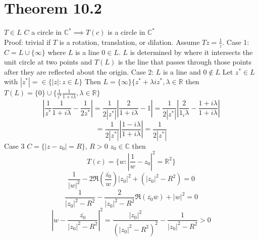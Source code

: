 \documentclass[11pt]{article}
\begin{document}
\section{Theorem 10.2}
$T \in L$  $C$ a circle in $ \mathbb{C}^{*} \implies T(c)$ is a circle  in $ \mathbb{C}^{*}$ \\
Proof:
trivial if $T$ is a rotation, translation, or dilation.
Assume  $Tz = \frac{1}{z}$.
Case 1: $C = L \cup \{\infty\}$ where $L$ is a line $0 \in L$.  $L$ is determined by where it intersects the unit circle at two points
and  $T(L)$ is the line that passes through those points after they are reflected about the origin.
Case 2:  $L$ is a line and  $0 \not\in L$ Let $z^{*} \in L$ with $|z^{*}| = \in\{|z| : z \in L\}$ 
Then $L = \{\infty\} \{z^{*} + \lambda i z^{*}, \lambda \in \mathbb{R}$ then $T(L) = \{0\} \cup \{\frac{1}{z^{*}}\frac{1}{1+ i \lambda}, \lambda \in \mathbb{R}\}$
\[
|\frac{1}{z^{*}} \frac{1}{1+i\lambda} - \frac{1}{2 z^{*}}| = \frac{1}{2|z^{*}|} |\frac{2}{1 + i\lambda} - 1| = \frac{1}{2 |z^{*}|} |\frac{2}{1 _ i\lambda} - \frac{1+ i\lambda}{1 + i\lambda}|
\] 
\[
 =  \frac{1}{2 |z^{*}|} | \frac{1- i\lambda}{ 1 + i \lambda}| = \frac{1}{2 |z^{*}|}
\] 
Case 3 $C = \{|z-z_0| = R\}$, $R > 0$  $z_0 \in \mathbb{C}$
then
\[
    T(c) = \{w : |\frac{1}{w} - z_0|^2 = \mathbb{R}^2\}
\] 
\[
\frac{1}{|w|^2} - 2 \Re( \frac{\overline{ z_0}}{w}) |z_0|^2  + (|z_0|^2- R^2) = 0
\] 
\[
\frac{1}{|z_0|^2 - R^2} - \frac{2}{|z_0|^2 - R^2}\Re(\overline{z_0} \overline{w}) + |w|^2 = 0
\] 
\[
|w-\frac{\overline{z_0}}{|z_0|^2 - R^2}|^2 = \frac{|z_0|^2}{(|z_0|^2 - R^2)^2} - \frac{1}{|z_0|^2 - R^2} > 0
\] 
\end{document}
